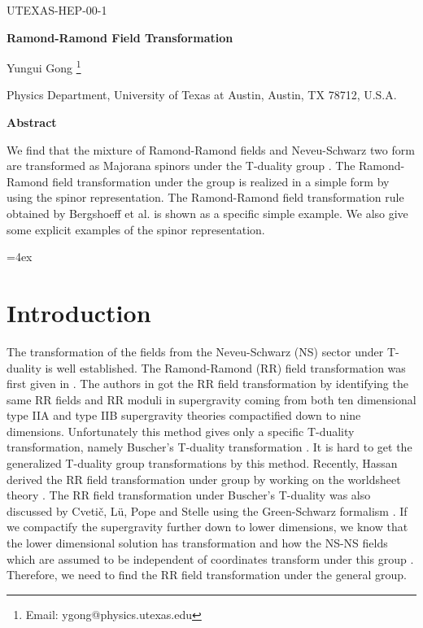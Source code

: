 \documentclass[a4paper,12pt]{article}
\begin{document}
\vspace *{2cm} 
\begin{flushright}
UTEXAS-HEP-00-1
\end{flushright}

\begin{center}
{\Large \bf Ramond-Ramond Field Transformation}

\bigskip

Yungui Gong \footnote{Email: ygong@physics.utexas.edu} 

Physics Department, University of Texas at Austin, Austin, TX 78712, U.S.A.
 
\bigskip
 
\vskip 0.8in
{\Large\bf Abstract}
\end{center}
We find that the mixture of Ramond-Ramond
fields and Neveu-Schwarz two form are transformed
as Majorana spinors under the T-duality group \coordHE{}.
The Ramond-Ramond field transformation under
the group \coordHE{} is realized in a simple
form by using the spinor representation. The 
Ramond-Ramond field transformation rule obtained
by Bergshoeff et al. is shown as a specific simple example.
We also give some explicit examples of the spinor
representation.



\vskip 6cm

\pagebreak

\parindent=4ex 

\section{Introduction}

The transformation of the fields from the Neveu-Schwarz (NS) sector
under T-duality is well established. The Ramond-Ramond (RR) 
field transformation was first given in \cite{bergshoeff95}.
The authors in \cite{bergshoeff95} got the RR field transformation
by identifying the same RR fields and RR moduli 
in \coordHE{} supergravity coming from both ten dimensional
type IIA and type IIB
supergravity theories compactified down to nine dimensions.
Unfortunately this method gives only a 
specific T-duality transformation,
namely Buscher's T-duality transformation
\cite{buscher87}. It is hard to
get the generalized T-duality group \coordHE{} transformations
by this method.  Recently, Hassan derived
the RR field transformation under \coordHE{} group
by working on the worldsheet
theory \cite{hassan99}. The RR field transformation
under Buscher's T-duality was also discussed 
by Cveti\v c, L\"{u}, Pope and Stelle 
using the Green-Schwarz formalism \cite{cvetic99}. 
If we compactify the \coordHE{} supergravity 
further down to lower dimensions, we know that the 
lower dimensional solution
has \coordHE{} transformation and how the NS-NS fields
which are assumed to be independent of \coordHE{} coordinates
transform
under this group \cite{sen91}. Therefore, we need to 
find the RR
field transformation under the general \coordHE{} group.
\end{document}
